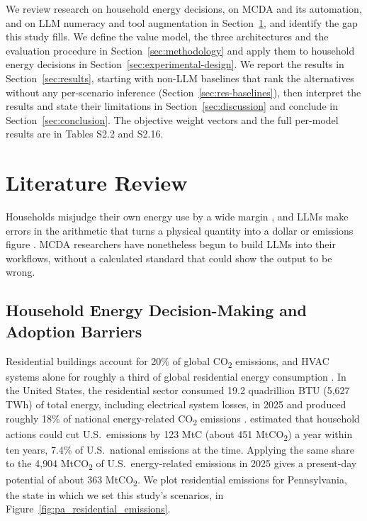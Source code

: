 \documentclass[final,3p,times]{elsarticle}
\begin{document}
We review research on household energy decisions, on MCDA and its automation, and on LLM numeracy and tool augmentation in Section~\ref{sec:lit-review}, and identify the gap this study fills. We define the value model, the three architectures and the evaluation procedure in Section~\ref{sec:methodology} and apply them to household energy decisions in Section~\ref{sec:experimental-design}. We report the results in Section~\ref{sec:results}, starting with non-LLM baselines that rank the alternatives without any per-scenario inference (Section~\ref{sec:res-baselines}), then interpret the results and state their limitations in Section~\ref{sec:discussion} and conclude in Section~\ref{sec:conclusion}. The objective weight vectors and the full per-model results are in Tables S2.2 and S2.16.

\section{Literature Review}
\label{sec:lit-review}
Households misjudge their own energy use by a wide margin \cite{attari2010}, and LLMs make errors in the arithmetic that turns a physical quantity into a dollar or emissions figure \cite{imani2023mathprompter}. MCDA researchers have nonetheless begun to build LLMs into their workflows, without a calculated standard that could show the output to be wrong.

\subsection{Household Energy Decision-Making and Adoption Barriers}
\label{sec:lit-barriers}

Residential buildings account for 20\% of global CO\textsubscript{2} emissions, and HVAC systems alone for roughly a third of global residential energy consumption \cite{GONZALEZTORRES2022112428}. In the United States, the residential sector consumed 19.2 quadrillion BTU (5,627 TWh) of total energy, including electrical system losses, in 2025 and produced roughly 18\% of national energy-related CO\textsubscript{2} emissions \cite{eia_mer2026}. \citet{dietz2009} estimated that household actions could cut U.S.\ emissions by 123 MtC (about 451 MtCO\textsubscript{2}) a year within ten years, 7.4\% of U.S.\ national emissions at the time. Applying the same share to the 4{,}904 MtCO\textsubscript{2} of U.S.\ energy-related emissions in 2025 \cite{eia_co2_2025} gives a present-day potential of about 363 MtCO\textsubscript{2}. We plot residential emissions for Pennsylvania, the state in which we set this study's scenarios, in Figure~\ref{fig:pa_residential_emissions}.
\end{document}
